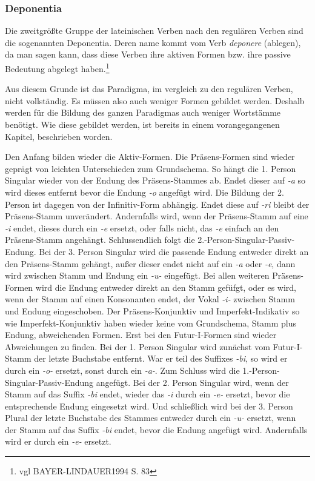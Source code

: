 \documentclass[12pt,abstract=on]{scrreprt}
\begin{document}
\subsubsection{Deponentia}
Die zweitgrößte Gruppe der lateinischen Verben nach den regulären Verben sind die sogenannten Deponentia. Deren name kommt vom Verb \textit{deponere} (ablegen), da man sagen kann, dass diese Verben ihre aktiven Formen bzw. ihre passive Bedeutung abgelegt haben.\footnote{vgl BAYER-LINDAUER1994 S. 83} \par
Aus diesem Grunde ist das Paradigma, im vergleich zu den regulären Verben, nicht vollständig. Es müssen also auch weniger Formen gebildet werden. Deshalb werden für die Bildung des ganzen Paradigmas auch weniger Wortstämme benötigt. Wie diese gebildet werden, ist bereits in einem vorangegangenen Kapitel, beschrieben worden. \par
Den Anfang bilden wieder die Aktiv-Formen. Die Präsens-Formen sind wieder geprägt von leichten Unterschieden zum Grundschema. So hängt die 1. Person Singular wieder von der Endung des Präsens-Stammes ab. Endet dieser auf \textit{-a} so wird dieses entfernt bevor die Endung \textit{-o} angefügt wird. Die Bildung der 2. Person ist dagegen von der Infinitiv-Form abhängig. Endet diese auf \textit{-ri} bleibt der Präsens-Stamm unverändert. Andernfalls wird, wenn der Präsens-Stamm auf eine \textit{-i} endet, dieses durch ein \textit{-e} ersetzt, oder falls nicht, das \textit{-e} einfach an den Präsens-Stamm angehängt. Schlussendlich folgt die 2.-Person-Singular-Passiv-Endung. Bei der 3. Person Singular wird die passende Endung entweder direkt an den Präsens-Stamm gehängt, außer dieser endet nicht auf ein \textit{-a} oder \textit{-e}, dann wird zwischen Stamm und Endung ein \textit{-u-} eingefügt. Bei allen weiteren Präsens-Formen wird die Endung entweder direkt an den Stamm gefüfgt, oder es wird, wenn der Stamm auf einen Konsonanten endet, der Vokal \textit{-i-} zwischen Stamm und Endung eingeschoben. Der Präsens-Konjunktiv und Imperfekt-Indikativ so wie Imperfekt-Konjunktiv haben wieder keine vom Grundschema, Stamm plus Endung, abweichenden Formen. Erst bei den Futur-I-Formen sind wieder Abweichungen zu finden. Bei der 1. Person Singular wird zunächst vom Futur-I-Stamm der letzte Buchstabe entfernt. War er teil des Suffixes \textit{-bi}, so wird er durch ein \textit{-o-} ersetzt, sonst durch ein \textit{-a-}. Zum Schluss wird die 1.-Person-Singular-Passiv-Endung angefügt. Bei der 2. Person Singular wird, wenn der Stamm auf das Suffix \textit{-bi} endet, wieder das \textit{-i} durch ein \textit{-e-} ersetzt, bevor die entsprechende Endung eingesetzt wird. Und schließlich wird bei der 3. Person Plural der letzte Buchstabe des Stammes entweder durch ein \textit{-u-} ersetzt, wenn der Stamm auf das Suffix \textit{-bi} endet, bevor die Endung angefügt wird. Andernfalls wird er durch ein \textit{-e-} ersetzt. \par
\end{document}
